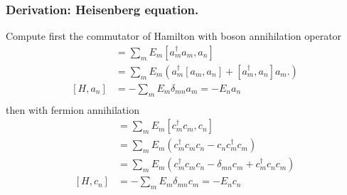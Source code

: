 \documentclass[../../../main.tex]{subfiles}
\begin{document}
\subsubsection{Derivation: Heisenberg equation.}
Compute first the commutator of Hamilton with boson annihilation operator
\begin{align*}
  [H,a_n] & = \sum_{m} E_m  [a_m^\dagger a_m, a_n]                                              \\
          & = \sum_{m } E_m \left(     a_m^\dagger [a_m, a_n] + [a_m^\dagger, a_n] a_m. \right) \\
  [H, a_n]
          & = -\sum_{m }E_m \delta_{mn} a_m= -E_n a_n                                           \\
\end{align*}
then with fermion annihilation
\begin{align*}
  [H, c_n] & = \sum_m E_m [c_m^{\dagger} c_m, c_n]                                           \\
           & =  \sum_m E_m (c_m^{\dagger} c_m c_n - c_n c_m^{\dagger} c_m)                   \\
           & =  \sum_m E_m (c_m^{\dagger} c_m c_n - \delta_{mn} c_m + c_m^{\dagger} c_n c_m) \\
  [H, c_n] & =  -\sum_m E_m \delta_{mn} c_m =  -E_n c_n                                      \\
\end{align*}
\end{document}
